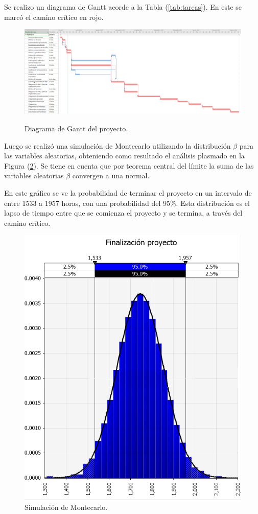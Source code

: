 Se realizo un diagrama de Gantt acorde a la Tabla (\ref{tab:tareas}). En este se marcó el camino crítico en rojo.
\begin{figure}[H]
	\centering
	\includegraphics[width=1\linewidth]{ImagenesFactibilidad/project}
	\label{fig:gantt}
	\caption{Diagrama de Gantt del proyecto.}
\end{figure}

Luego se realizó una simulación de Montecarlo utilizando la distribución $\beta$ para las variables aleatorias, obteniendo como resultado el análisis plasmado en la Figura (\ref{fig:montecarlo_tiempos}). Se tiene en cuenta que por teorema central del límite la suma de las variables aleatorias $\beta$ convergen a una normal.

En este gráfico se ve la probabilidad de terminar el proyecto en un intervalo de entre 1533 a 1957 horas, con una probabilidad del 95\%. Esta distribución es el lapso de tiempo entre que se comienza el proyecto y se termina, a través del camino crítico.

\begin{figure}[H]
	\centering
	\includegraphics[width=0.5\linewidth]{ImagenesFactibilidad/montecarlo}
	\caption{Simulación de Montecarlo.}	
	\label{fig:montecarlo_tiempos}
\end{figure}


